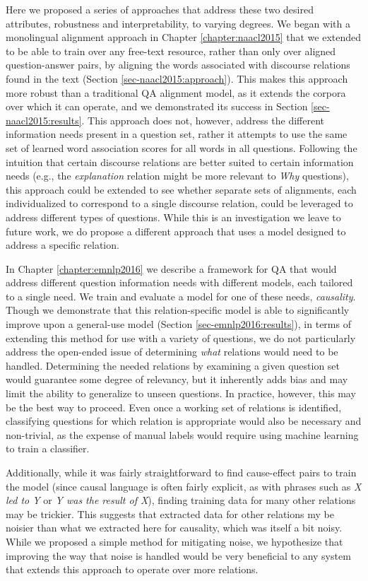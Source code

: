 Here we proposed a series of approaches that address these two desired attributes, robustness and interpretability, to varying degrees.  We began with a monolingual alignment approach in Chapter \ref{chapter:naacl2015} that we extended to be able to train over any free-text resource, rather than only over aligned question-answer pairs, by aligning the words associated with discourse relations found in the text (Section \ref{sec-naacl2015:approach}).  This makes this approach more robust than a traditional QA alignment model, as it extends the corpora over which it can operate, and we demonstrated its success in Section \ref{sec-naacl2015:results}.  This approach does not, however, address the different information needs present in a question set, rather it attempts to use the same set of learned word association scores for all words in all questions.  Following the intuition that certain discourse relations are better suited to certain information needs (e.g., the \textit{explanation} relation might be more relevant to \textit{Why} questions), this approach could be extended to see whether separate sets of alignments, each individualized to correspond to a single discourse relation, could be leveraged to address different types of questions.   While this is an investigation we leave to future work, we do propose a different approach that uses a model designed to address a specific relation.

In Chapter \ref{chapter:emnlp2016} we describe a framework for QA that would address different question information needs with different models, each tailored to a single need.  We train and evaluate a model for one of these needs, \textit{causality}.  Though we demonstrate that this relation-specific model is able to significantly improve upon a general-use model (Section \ref{sec-emnlp2016:results}), in terms of extending this method for use with a variety of questions, we do not particularly address the open-ended issue of determining \textit{what} relations would need to be handled.  Determining the needed relations by examining a given question set would guarantee some degree of relevancy, but it inherently adds bias and may limit the ability to generalize to unseen questions.  In practice, however, this may be the best way to proceed.  Even once a working set of relations is identified, classifying questions for which relation is appropriate would also be necessary and non-trivial, as the expense of manual labels would require using machine learning to train a classifier.
  
Additionally, while it was fairly straightforward to find cause-effect pairs to train the model (since causal language is often fairly explicit, as with phrases such as \textit{X led to Y} or \textit{Y was the result of X}), finding training data for many other relations may be trickier.  This suggests that extracted data for other relations my be noisier than what we extracted here for causality, which was itself a bit noisy.  While we proposed a simple method for mitigating noise, we hypothesize that improving the way that noise is handled would be very beneficial to any system that extends this approach to operate over more relations.

